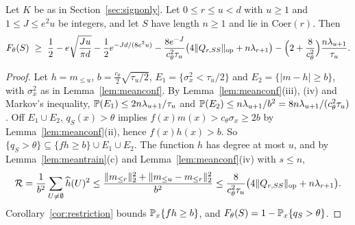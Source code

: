 \begin{proposition}\label{prop:master}
Let $K$ be as in Section~\ref{sec:signonly}. Let $0\le r\le u<d$ with
$u\ge1$ and $1\le J\le e^2u$ be integers, and let $S$ have length $n\ge1$
and lie in $\mathrm{Coer}(r)$. Then
\[
 F_\theta(S)\ \ge\ \frac12-e\sqrt{\frac{Ju}{\pi d}}
 -\frac12e^{-Jd/(8e^2u)}
 -\frac{8e^{-J}}{c_\theta^2\tau_u}\bigl(4\|Q_{r,SS}\|_{\rm op}+n\lambda_{r+1}\bigr)
 -\Bigl(2+\frac8{c_\theta^2}\Bigr)\frac{n\lambda_{u+1}}{\tau_u}.
\]
\end{proposition}
\begin{proof}
Let $h=m_{\le u}$, $b=\frac{c_\theta}2\sqrt{\tau_u/2}$,
$E_1=\{\sigma_x^2<\tau_u/2\}$ and $E_2=\{|m-h|\ge b\}$, with $\sigma_x^2$ as
in Lemma~\ref{lem:meanconf}. By Lemma~\ref{lem:meanconf}(iii), (iv) and
Markov's inequality, $\mathbb P(E_1)\le2n\lambda_{u+1}/\tau_u$ and
$\mathbb P(E_2)\le n\lambda_{u+1}/b^2=8n\lambda_{u+1}/(c_\theta^2\tau_u)$. Off
$E_1\cup E_2$, $q_S(x)>\theta$ implies $f(x)m(x)>c_\theta\sigma_x\ge2b$ by
Lemma~\ref{lem:meanconf}(ii), hence $f(x)h(x)>b$. So
$\{q_S>\theta\}\subseteq\{fh\ge b\}\cup E_1\cup E_2$. The function $h$ has
degree at most $u$, and by Lemma~\ref{lem:meantrain}(c) and
Lemma~\ref{lem:meanconf}(iv) with $s\le n$,
\[
 \mathcal R=\frac1{b^2}\sum_{U\ne\emptyset}\widehat h(U)^2
 \le\frac{\|m_{\le r}\|_2^2+\|m_{\le u}-m_{\le r}\|_2^2}{b^2}
 \le\frac8{c_\theta^2\tau_u}\bigl(4\|Q_{r,SS}\|_{\rm op}+n\lambda_{r+1}\bigr).
\]
Corollary~\ref{cor:restriction} bounds $\mathbb P_x\{fh\ge b\}$, and
$F_\theta(S)=1-\mathbb P_x\{q_S>\theta\}$.
\end{proof}

